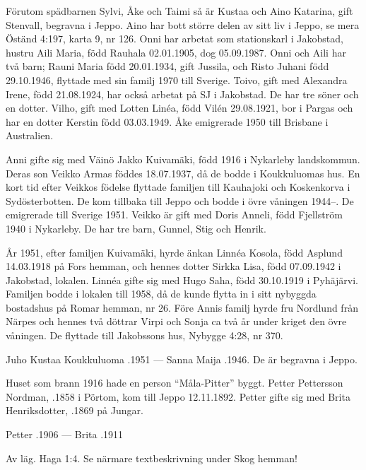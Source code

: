 Förutom spädbarnen Sylvi, Åke och Taimi så är Kustaa och Aino	Katarina, gift Stenvall, begravna i Jeppo. Aino har bott större delen av sitt liv i Jeppo, se mera Öständ 4:197, karta 9, nr 126. Onni har arbetat som 	stationskarl i Jakobstad, hustru Aili Maria, född Rauhala 02.01.1905, dog	05.09.1987. Onni och Aili har två barn; Rauni Maria född 20.01.1934, gift Jussila, och Risto Juhani född 29.10.1946, flyttade med sin familj 1970	till Sverige. Toivo, gift med Alexandra Irene, född 21.08.1924, har också	arbetat på SJ i Jakobstad. De har tre söner och en dotter. Vilho, gift med	Lotten Linéa, född Vilén 29.08.1921, bor i Pargas och har en dotter	Kerstin född 03.03.1949. Åke emigrerade 1950 till Brisbane i Australien.

Anni gifte sig med Väinö Jakko Kuivamäki, född 1916 i Nykarleby landskommun. Deras son Veikko Armas föddes 18.07.1937, då de bodde i Koukkuluomas hus. En kort tid efter Veikkos födelse flyttade familjen till Kauhajoki och Koskenkorva i Sydösterbotten. De kom tillbaka till Jeppo och bodde i övre våningen 1944--. De emigrerade till Sverige 1951. Veikko är gift med Doris Anneli, född Fjellström 1940 i Nykarleby. De har tre barn, Gunnel, Stig och Henrik.

År 1951, efter familjen Kuivamäki, hyrde änkan Linnéa Kosola, född Asplund 14.03.1918 på Fors hemman, och hennes dotter Sirkka Lisa, född 07.09.1942 i Jakobstad, lokalen. Linnéa gifte sig med	Hugo Saha, född 30.10.1919 i Pyhäjärvi. Familjen bodde i lokalen till 1958, då de kunde flytta in i sitt nybyggda bostadshus på Romar hemman, nr 26. Före Annis familj hyrde fru Nordlund från Närpes och hennes två döttrar Virpi och Sonja ca två år under kriget den övre våningen. De flyttade till Jakobssons hus, Nybygge 4:28, nr 370.

Juho Kustaa Koukkuluoma .1951  ---  Sanna Maija .1946. De är begravna i Jeppo.

Huset som brann 1916 hade en person ``Måla-Pitter'' byggt. Petter Pettersson Nordman, .1858 i Pörtom, kom till Jeppo 12.11.1892. Petter gifte sig med Brita Henriksdotter, .1869 på Jungar.

Petter .1906  ---  Brita .1911



Av läg. Haga 1:4.
Se närmare textbeskrivning under Skog hemman!\jhvspace{}
